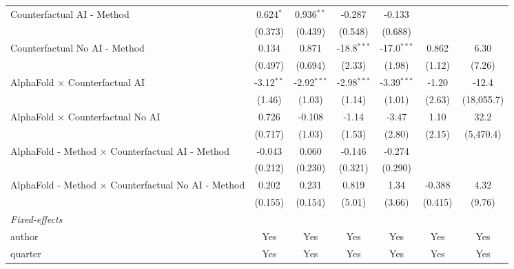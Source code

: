 \begin{tabular}{lcccccc}
   Counterfactual AI - Method                                 & 0.624$^{*}$  & 0.936$^{**}$  & -0.287        & -0.133        &         &   \\   
                                                              & (0.373)      & (0.439)       & (0.548)       & (0.688)       &         &   \\   
   Counterfactual No AI - Method                              & 0.134        & 0.871         & -18.8$^{***}$ & -17.0$^{***}$ & 0.862   & 6.30\\   
                                                              & (0.497)      & (0.694)       & (2.33)        & (1.98)        & (1.12)  & (7.26)\\   
   AlphaFold $\times$ Counterfactual AI                       & -3.12$^{**}$ & -2.92$^{***}$ & -2.98$^{***}$ & -3.39$^{***}$ & -1.20   & -12.4\\   
                                                              & (1.46)       & (1.03)        & (1.14)        & (1.01)        & (2.63)  & (18,055.7)\\   
   AlphaFold $\times$ Counterfactual No AI                    & 0.726        & -0.108        & -1.14         & -3.47         & 1.10    & 32.2\\   
                                                              & (0.717)      & (1.03)        & (1.53)        & (2.80)        & (2.15)  & (5,470.4)\\   
   AlphaFold - Method $\times$ Counterfactual AI - Method     & -0.043       & 0.060         & -0.146        & -0.274        &         &   \\   
                                                              & (0.212)      & (0.230)       & (0.321)       & (0.290)       &         &   \\   
   AlphaFold - Method $\times$ Counterfactual No AI - Method  & 0.202        & 0.231         & 0.819         & 1.34          & -0.388  & 4.32\\   
                                                              & (0.155)      & (0.154)       & (5.01)        & (3.66)        & (0.415) & (9.76)\\   
   \midrule
   \emph{Fixed-effects}\\
   author                                                     & Yes          & Yes           & Yes           & Yes           & Yes     & Yes\\  
   quarter                                                    & Yes          & Yes           & Yes           & Yes           & Yes     & Yes\\  

\end{tabular}

